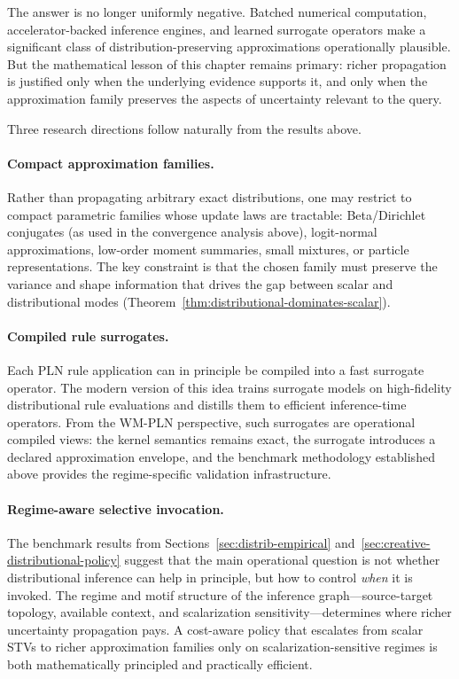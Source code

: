 \documentclass[11pt,openany]{report}
\begin{document}
The answer is no longer uniformly negative.  Batched numerical computation,
accelerator-backed inference engines, and learned surrogate operators make a
significant class of distribution-preserving approximations operationally
plausible.  But the mathematical lesson of this chapter remains primary:
richer propagation is justified only when the underlying evidence supports it,
and only when the approximation family preserves the aspects of uncertainty
relevant to the query.

Three research directions follow naturally from the results above.

\paragraph{Compact approximation families.}
Rather than propagating arbitrary exact distributions, one may restrict to
compact parametric families whose update laws are tractable: Beta/Dirichlet
conjugates (as used in the convergence analysis above), logit-normal approximations,
low-order moment summaries, small mixtures, or particle representations.
The key constraint is that the chosen family must preserve the variance
and shape information that drives the gap between scalar and distributional
modes (Theorem~\ref{thm:distributional-dominates-scalar}).

\paragraph{Compiled rule surrogates.}
Each PLN rule application can in principle be compiled into a fast surrogate
operator.  The modern version of this idea trains surrogate models on
high-fidelity distributional rule evaluations and distills them to efficient
inference-time operators.  From the WM-PLN perspective, such surrogates are
operational compiled views: the kernel semantics remains exact, the surrogate
introduces a declared approximation envelope, and the benchmark methodology
established above provides the regime-specific validation infrastructure.

\paragraph{Regime-aware selective invocation.}
The benchmark results from Sections~\ref{sec:distrib-empirical}
and~\ref{sec:creative-distributional-policy} suggest that the main
operational question is not whether distributional inference can help in
principle, but how to control \emph{when} it is invoked.  The regime
and motif structure of the inference graph---source-target topology,
available context, and scalarization sensitivity---determines where richer
uncertainty propagation pays.  A cost-aware policy that escalates from
scalar STVs to richer approximation families only on
scalarization-sensitive regimes is both mathematically principled and
practically efficient.
\end{document}

